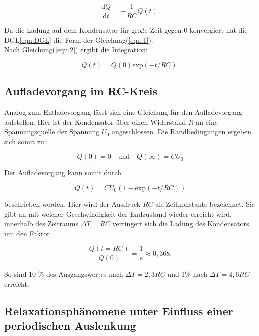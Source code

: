        \begin{equation}
            \frac{\text{d}Q}{\text{d}t} = - \frac{1}{RC} Q(t).
            \label{eqn:DGL}
        \end{equation}

        \noindent Da die Ladung auf dem Kondensator für große Zeit gegen 0 konvergiert hat die DGL\ref{eqn:DGL} die Form der 
        Gleichung(\ref{eqn:1}).\\ Nach Gleichung(\ref{eqn:2}) ergibt die Integration:

        \begin{equation*}
            Q(t) = Q(0) \text{exp}(-t/RC).
        \end{equation*}

    \subsection{Aufladevorgang im RC-Kreis}

        \noindent Analog zum Entladevorgang lässt sich eine Gleichung für den Aufladevorgang aufstellen. Hier ist der Kondensator über einen 
        Widerstand $R$ an eine Spannungsquelle der Spannung $U_0$ angeschlossen. Die Randbedingungen ergeben sich somit zu:
    
        \begin{equation*}
            Q(0) = 0 \quad \text{und} \quad Q(\infty) = CU_0 
        \end{equation*}

        \noindent Der Aufladevorgang kann somit durch 

        \begin{equation*}
            Q(t) = CU_0(1- \text{exp}(-t/RC))
        \end{equation*}

        \noindent beschrieben werden. Hier wird der Ausdruck $RC$ als Zeitkonstante bezeichnet. Sie gibt an mit welcher Geschwindigkeit der 
        Endzustand wieder erreicht wird, innerhalb des Zeitraums $\Delta T = RC$ verringert sich die Ladung des Kondensators um den Faktor

        \begin{equation*}
            \frac{Q(t = RC)}{Q(0)} = \frac{1}{e} \approx 0,368 .
        \end{equation*}

        \noindent So sind 10 \% des Ausgangswertes nach $\Delta T = 2,3RC$ und 1\% nach $\Delta T = 4,6RC$ erreicht.

    \subsection{Relaxationsphänomene unter Einfluss einer periodischen Auslenkung}

